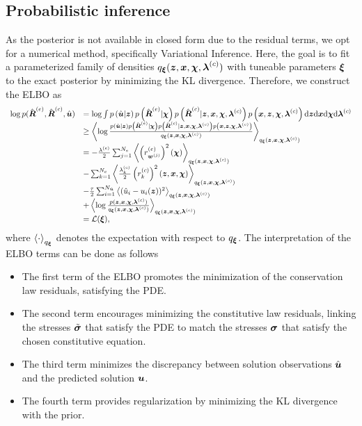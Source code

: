 \subsection{Probabilistic inference}
As the posterior is not available in closed form due to the residual terms, we opt for a numerical method, specifically Variational Inference. Here, the goal is to fit a parameterized family of densities $q_{\boldsymbol{\xi}}(\boldsymbol{z}, \boldsymbol{x}, \boldsymbol{\chi}, \boldsymbol{\lambda}^{(c)})$ with tuneable parameters $\boldsymbol{\xi}$ to the exact posterior by minimizing the KL divergence. Therefore, we construct the ELBO as
\begin{equation}
    \begin{array}{ll}
        \log p(\hRe, \hRc, \hu) & = \log \int p \left( \hu|\z \right) p\left(\hRe | \ve \chi\right) p\left( \hRc | \z,\x, \ve \chi, \vlamc\right) p\left( \x, \z, \ve \chi, \vlamc\right) \diff\z \diff\x \diff\ve \chi \diff \vlamc \\
        &\geq \left< \log \frac{p \left( \hu|\z \right) p\left(\hRe | \ve \chi\right) p\left( \hRc | \z,\x, \ve \chi, \vlamc\right) p\left( \x, \z, \ve \chi, \vlamc\right)}{q_{\ve \xi}(\z, \x, \ve \chi, \vlamc)} \right>_{q_{\ve \xi}(\z, \x, \ve \chi, \vlamc)} \\ %
        & = -\frac{\lame}{2} \sum_{j=1}^{N_e} \left< \left(\re_{\ve w^{(j)}} \right)^2 (\ve \chi) \right>_{q_{\ve \xi}(\z, \x, \ve \chi, \vlamc)} \\
        &- \sum_{k=1}^{N_c} \left< \frac{\lamc_k}{2} \left(\rc_k \right)^2 (\z, \x, \ve \chi) \right>_{q_{\ve \xi}(\z, \x, \ve \chi, \vlamc)} \\
        &- \frac{\tau}{2}  \sum_{i=1}^{N_{\hat{\ve u}}} \left< (\hat{ u}_i -  u_i(\z))^2 \right>_{q_{\ve \xi}(\z, \x, \ve \chi, \vlamc)} \\
        & + \left< \log \frac{p(\z, \x, \ve \chi, \vlamc)}{q_{\ve \xi}(\z, \x, \ve \chi, \vlamc)} \right>_{q_{\ve \xi}(\z, \x, \ve \chi, \vlamc)} \\
        & = \mathcal{L}(\ve \xi),
    \end{array}
\label{eqn:ELBO}
\end{equation}
where $\left< \cdot \right>_{q_{\boldsymbol{\xi}}}$ denotes the expectation with respect to $q_{\boldsymbol{\xi}}$. The interpretation of the ELBO terms can be done as follows
\begin{itemize}
    \item The first term of the ELBO promotes the minimization of the conservation law residuals, satisfying the PDE.
    \item The second term encourages minimizing the constitutive law residuals, linking the stresses $\tilde{\boldsymbol{\sigma}}$ that satisfy the PDE to match the stresses $\boldsymbol{\sigma}$ that satisfy the chosen constitutive equation.
    \item The third term minimizes the discrepancy between solution observations $\hat{\boldsymbol{u}}$ and the predicted solution $\boldsymbol{u}$. 
    \item The fourth term provides regularization by minimizing the KL divergence with the prior. 
\end{itemize}


